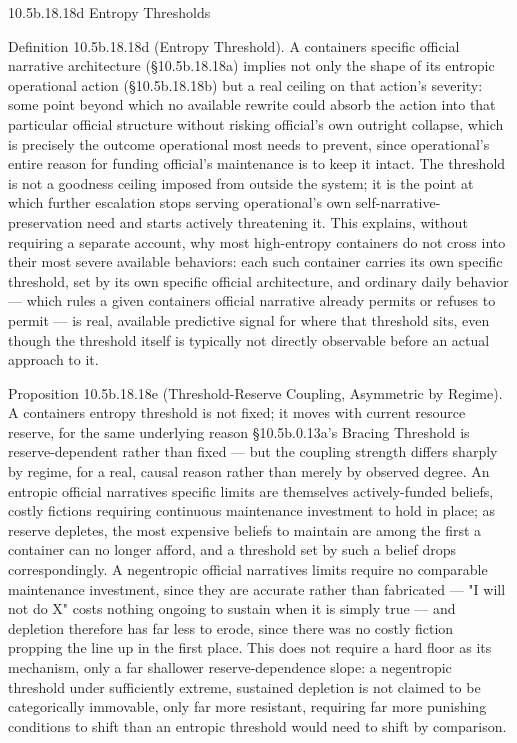 \documentclass[
]{article}
\begin{document}
10.5b.18.18d Entropy Thresholds

Definition 10.5b.18.18d (Entropy Threshold). A containers specific
official narrative architecture (§10.5b.18.18a) implies not only the
shape of its entropic operational action (§10.5b.18.18b) but a real
ceiling on that action's severity: some point beyond which no available
rewrite could absorb the action into that particular official structure
without risking official's own outright collapse, which is precisely the
outcome operational most needs to prevent, since operational's entire
reason for funding official's maintenance is to keep it intact. The
threshold is not a goodness ceiling imposed from outside the system; it
is the point at which further escalation stops serving operational's own
self-narrative-preservation need and starts actively threatening it.
This explains, without requiring a separate account, why most
high-entropy containers do not cross into their most severe available
behaviors: each such container carries its own specific threshold, set
by its own specific official architecture, and ordinary daily behavior
--- which rules a given containers official narrative already permits or
refuses to permit --- is real, available predictive signal for where
that threshold sits, even though the threshold itself is typically not
directly observable before an actual approach to it.

Proposition 10.5b.18.18e (Threshold-Reserve Coupling, Asymmetric by
Regime). A containers entropy threshold is not fixed; it moves with
current resource reserve, for the same underlying reason §10.5b.0.13a's
Bracing Threshold is reserve-dependent rather than fixed --- but the
coupling strength differs sharply by regime, for a real, causal reason
rather than merely by observed degree. An entropic official narratives
specific limits are themselves actively-funded beliefs, costly fictions
requiring continuous maintenance investment to hold in place; as reserve
depletes, the most expensive beliefs to maintain are among the first a
container can no longer afford, and a threshold set by such a belief
drops correspondingly. A negentropic official narratives limits require
no comparable maintenance investment, since they are accurate rather
than fabricated --- "I will not do X" costs nothing ongoing to sustain
when it is simply true --- and depletion therefore has far less to
erode, since there was no costly fiction propping the line up in the
first place. This does not require a hard floor as its mechanism, only a
far shallower reserve-dependence slope: a negentropic threshold under
sufficiently extreme, sustained depletion is not claimed to be
categorically immovable, only far more resistant, requiring far more
punishing conditions to shift than an entropic threshold would need to
shift by comparison.
\end{document}
